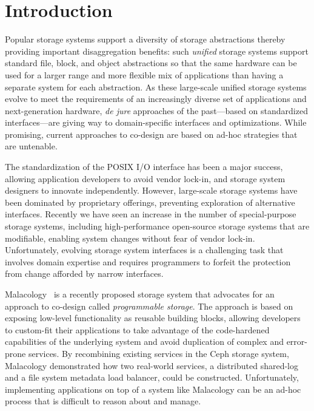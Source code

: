 \section{Introduction}
\label{sec:intro}

Popular storage systems support a diversity of storage abstractions thereby
providing important disaggregation benefits: such \emph{unified} storage
systems support standard file, block, and object abstractions so that the same
hardware can be used for a larger range and more flexible mix of applications
than having a separate  system for each abstraction.  As these large-scale
unified storage systems evolve to meet the requirements of an increasingly
diverse set of applications and next-generation hardware, \emph{de jure}
approaches of the past---based on standardized interfaces---are giving way to
domain-specific interfaces and optimizations. While promising, current
approaches to co-design are based on ad-hoc strategies that are untenable.

The standardization of the POSIX I/O interface has been a major success,
allowing application developers to avoid vendor lock-in, and storage system
designers to innovate independently.
However, large-scale storage systems have been
dominated by proprietary offerings, preventing exploration of alternative
interfaces. Recently we have seen an increase
in the number of special-purpose storage systems, including high-performance
open-source storage systems that are modifiable, enabling system changes
without fear of vendor lock-in. Unfortunately, evolving storage system
interfaces is a challenging task that involves domain expertise and requires
programmers to forfeit the protection from change afforded by narrow
interfaces.

Malacology~\cite{sevilla:eurosys17} is a recently proposed storage system that
advocates for an approach to co-design called \emph{programmable storage}. The
approach is based on exposing low-level functionality as reusable building
blocks, allowing developers to custom-fit their applications to take advantage
of the code-hardened capabilities of the underlying system and avoid
duplication of complex and error-prone services. By recombining existing
services in the Ceph storage system, Malacology demonstrated how two
real-world services, a distributed shared-log and a file system metadata load
balancer, could be constructed. Unfortunately, implementing
applications on top of a system like Malacology can be an ad-hoc process
that is difficult to reason about and manage.

